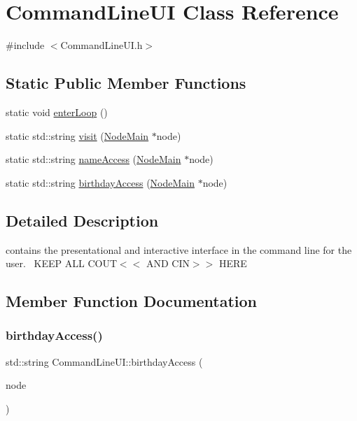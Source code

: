 \hypertarget{class_command_line_u_i}{}\section{Command\+Line\+UI Class Reference}
\label{class_command_line_u_i}


{\ttfamily \#include $<$Command\+Line\+U\+I.\+h$>$}

\subsection*{Static Public Member Functions}
\begin{DoxyCompactItemize}
\item 
static void \hyperlink{class_command_line_u_i_ac72a09121b78bdf1ab1f457795fcf370}{enter\+Loop} ()
\item 
static std\+::string \hyperlink{class_command_line_u_i_aa3aa6bc65288fac3cdfa611094ab7646}{visit} (\hyperlink{class_node_main}{Node\+Main} $\ast$node)
\item 
static std\+::string \hyperlink{class_command_line_u_i_afaceee7574a4ed29efc107e2ab2c9087}{name\+Access} (\hyperlink{class_node_main}{Node\+Main} $\ast$node)
\item 
static std\+::string \hyperlink{class_command_line_u_i_a901204652cd0e1ada6aada345f30ecff}{birthday\+Access} (\hyperlink{class_node_main}{Node\+Main} $\ast$node)
\end{DoxyCompactItemize}


\subsection{Detailed Description}
contains the presentational and interactive interface in the command line for the user.~\newline
K\+E\+EP A\+LL C\+O\+UT$<$$<$ A\+ND C\+IN$>$$>$ H\+E\+RE 

\subsection{Member Function Documentation}
\mbox{\label{class_command_line_u_i_a901204652cd0e1ada6aada345f30ecff}} 
\subsubsection{\texorpdfstring{birthday\+Access()}{birthdayAccess()}}
{\footnotesize\ttfamily std\+::string Command\+Line\+U\+I\+::birthday\+Access (\begin{DoxyParamCaption}\item[{\hyperlink{class_node_main}{Node\+Main} $\ast$}]{node }\end{DoxyParamCaption})\hspace{0.3cm}{\ttfamily [static]}}

